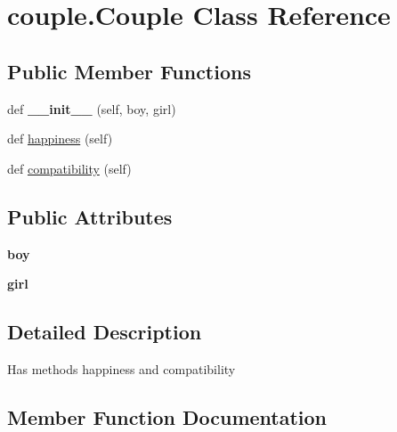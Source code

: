 \hypertarget{classcouple_1_1_couple}{}\section{couple.\+Couple Class Reference}
\label{classcouple_1_1_couple}
\subsection*{Public Member Functions}
\begin{DoxyCompactItemize}
\item 
\mbox{\label{classcouple_1_1_couple_a3cd6b67c48b545c1b51a8c11ac70677c}} 
def {\bfseries \+\_\+\+\_\+init\+\_\+\+\_\+} (self, boy, girl)
\item 
def \hyperlink{classcouple_1_1_couple_ab7ac98ab6a0dd03bf75790f949cb0c90}{happiness} (self)
\item 
def \hyperlink{classcouple_1_1_couple_a1752d35bbc3da6524676374511693988}{compatibility} (self)
\end{DoxyCompactItemize}
\subsection*{Public Attributes}
\begin{DoxyCompactItemize}
\item 
\mbox{\label{classcouple_1_1_couple_a9add8e4c50bcbf4424339df43ed77df6}} 
{\bfseries boy}
\item 
\mbox{\label{classcouple_1_1_couple_a99b4aa0aa5cd56aab0edebbba13e31b3}} 
{\bfseries girl}
\end{DoxyCompactItemize}


\subsection{Detailed Description}
\begin{DoxyVerb}Has methods  happiness and compatibility
\end{DoxyVerb}
 

\subsection{Member Function Documentation}
\mbox{\label{classcouple_1_1_couple_a1752d35bbc3da6524676374511693988}} 
